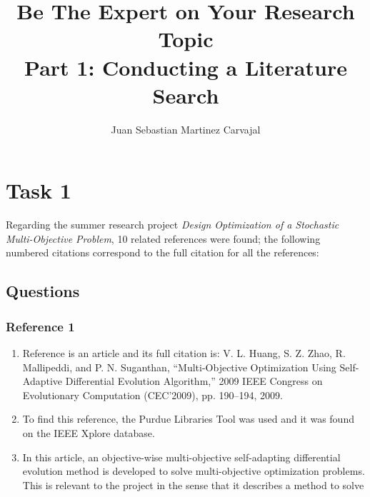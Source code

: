 \documentclass{journal}
\title{\textbf{Be The Expert on Your Research Topic}\\Part 1: Conducting a Literature Search}
\author{Juan Sebastian Martinez Carvajal}
\date{}
\begin{document}
\maketitle
\hrulefill

\section{Task 1}
Regarding the summer research project \textit{Design Optimization of a Stochastic Multi-Objective Problem}, 10 related references were found; the following numbered citations correspond to the full citation for all the references:\\




\subsection{Questions}

\subsubsection{Reference 1}
\begin{enumerate}
	\item Reference \cite{Huang2009} is an article and its full citation is: V. L. Huang, S. Z. Zhao, R. Mallipeddi, and P. N. Suganthan, “Multi-Objective Optimization Using Self-Adaptive Differential Evolution Algorithm,” 2009 IEEE Congress on Evolutionary Computation (CEC’2009), pp. 190–194, 2009.
	\item To find this reference, the Purdue Libraries Tool was used and it was found on the IEEE Xplore database.
	\item In this article, an objective-wise multi-objective self-adapting differential evolution method is developed to solve multi-objective optimization problems. This is relevant to the project in the sense that it describes a method to solve 
\end{enumerate}
\end{document}
